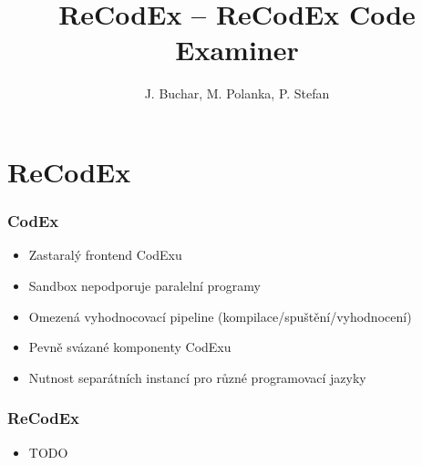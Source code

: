 \documentclass{beamer}
\begin{document}

\title[ReCodEx -- ReCodEx Code Examiner] %
{ReCodEx -- ReCodEx Code Examiner}
\author[Buchar, Polanka, Stefan]{J. Buchar, M. Polanka, P. Stefan}
\date[3. 12. 2016]{} %
\subject{Computer Science}

\frame{\titlepage}

\section{ReCodEx}

\begin{frame}
	\frametitle{CodEx}
	\begin{itemize}
		\item Zastaralý frontend CodExu
		\item Sandbox nepodporuje paralelní programy
		\item Omezená vyhodnocovací pipeline (kompilace/spuštění/vyhodnocení)
		\item Pevně svázané komponenty CodExu
		\item Nutnost separátních instancí pro různé programovací jazyky
	\end{itemize}
\end{frame}

\begin{frame}
	\frametitle{ReCodEx}
	\begin{itemize}
		\item TODO
	\end{itemize}
\end{frame}
\end{document}
